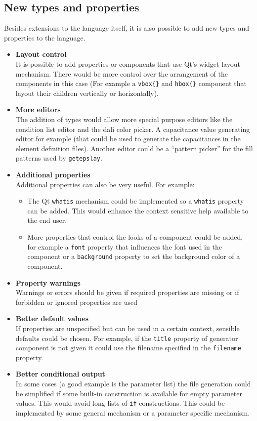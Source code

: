 \subsection{New types and properties}
Besides extensions to the language itself, it is also possible to add new types
and properties to the language.
\begin{itemize}
\item \textbf{Layout control\\ } It is possible to add properties or components
that use Qt's widget layout mechanism. There would be more control over the
arrangement of the components in this case (For example a \verb=vbox{}= and
\verb=hbox{}= component that layout their children vertically or horizontally).
\item \textbf{More editors\\ } The addition of types would allow more special
purpose editors like the condition list editor and the dali color picker. A
capacitance value generating editor for example (that could be used to generate
the capacitances in the element definition files). Another editor could be a
``pattern picker'' for the fill patterns used by \verb=getepslay=.
\item \textbf{Additional properties\\ } Additional properties can also be very
useful. For example:
    \begin{itemize}
    \item The Qt \verb=whatis= mechanism could be implemented so a \verb=whatis=
    property can be added. This would enhance the context sensitive help
    available to the end user.
    \item More properties that control the looks of a component could be added,
    for example a \verb=font= property that influences the font used in the
    component or a \verb=background= property to set the background color of a
    component.
    \end{itemize}
\item \textbf{Property warnings\\ } Warnings or errors should be given if
required properties are missing or if forbidden or ignored properties are used
\item \textbf{Better default values\\ } If properties are unspecified but can
be used in a certain context, sensible defaults could be chosen. For example,
if the \verb=title= property of generator component is not given it could use
the filename specified in the \verb=filename= property.
\item \textbf{Better conditional output\\ } In some cases (a good example is the
parameter list) the file generation could be simplified if some built-in
construction is available for empty parameter values. This would avoid long
lists of \verb=if= constructions. This could be implemented by some general
mechanism or a parameter specific mechanism.
\end{itemize}
